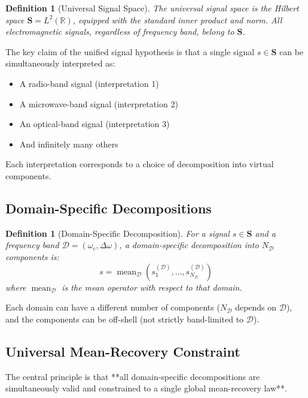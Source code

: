 \documentclass[twocolumn,11pt,a4paper]{article}
\newtheorem{definition}[theorem]{Definition}
\newcommand{\signal}{s}
\newcommand{\Signal}{\mathbf{S}}
\newcommand{\bandwidth}{\Delta{\omega}}
\newcommand{\domain}{\mathcal{D}}
\newcommand{\mean}{\operatorname{mean}}
\newcommand{\freq}{\omega}
\begin{document}
\begin{definition}[Universal Signal Space]
The \emph{universal signal space} is the Hilbert space $\Signal = L^2(\mathbb{R})$, equipped with the standard inner product and norm. All electromagnetic signals, regardless of frequency band, belong to $\Signal$.
\end{definition}

The key claim of the unified signal hypothesis is that a single signal $\signal \in \Signal$ can be simultaneously interpreted as:
\begin{itemize}[nosep]
  \item A radio-band signal (interpretation 1)
  \item A microwave-band signal (interpretation 2)
  \item An optical-band signal (interpretation 3)
  \item And infinitely many others
\end{itemize}

Each interpretation corresponds to a choice of decomposition into virtual components.

\subsection{Domain-Specific Decompositions}

\begin{definition}[Domain-Specific Decomposition]
For a signal $\signal \in \Signal$ and a frequency band $\domain = (\freq_c, \bandwidth)$, a \emph{domain-specific decomposition} into $N_\domain$ components is:
\begin{equation}
  \signal = \mean_\domain(\signal_1^{(\domain)}, \ldots, \signal_{N_\domain}^{(\domain)})
\end{equation}
where $\mean_\domain$ is the mean operator with respect to that domain.
\end{definition}

Each domain can have a different number of components ($N_\domain$ depends on $\domain$), and the components can be off-shell (not strictly band-limited to $\domain$).

\subsection{Universal Mean-Recovery Constraint}

The central principle is that **all domain-specific decompositions are simultaneously valid and constrained to a single global mean-recovery law**.
\end{document}
